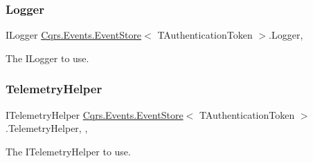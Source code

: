 \subsubsection{\texorpdfstring{Logger}{Logger}}
{\footnotesize\ttfamily I\+Logger \hyperlink{classCqrs_1_1Events_1_1EventStore}{Cqrs.\+Events.\+Event\+Store}$<$ T\+Authentication\+Token $>$.Logger\hspace{0.3cm}{\ttfamily [get]}, {\ttfamily [protected]}}



The I\+Logger to use. 

\mbox{\label{classCqrs_1_1Events_1_1EventStore_a75d6d3ad3a26fb9b511e2a98e72260f9_a75d6d3ad3a26fb9b511e2a98e72260f9}} 
\subsubsection{\texorpdfstring{Telemetry\+Helper}{TelemetryHelper}}
{\footnotesize\ttfamily I\+Telemetry\+Helper \hyperlink{classCqrs_1_1Events_1_1EventStore}{Cqrs.\+Events.\+Event\+Store}$<$ T\+Authentication\+Token $>$.Telemetry\+Helper\hspace{0.3cm}{\ttfamily [get]}, {\ttfamily [set]}, {\ttfamily [protected]}}



The I\+Telemetry\+Helper to use. 

